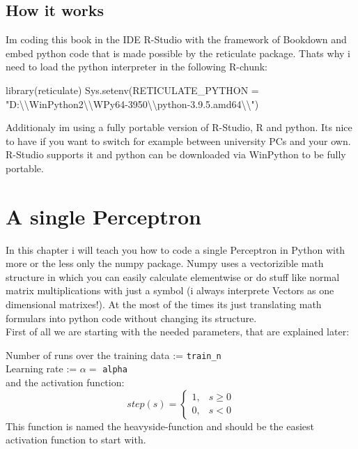 \documentclass[
]{book}
\newenvironment{Shaded}{\begin{snugshade}}{\end{snugshade}}
\newcommand{\AttributeTok}[1]{\textcolor[rgb]{0.77,0.63,0.00}{#1}}
\newcommand{\FunctionTok}[1]{\textcolor[rgb]{0.00,0.00,0.00}{#1}}
\newcommand{\NormalTok}[1]{#1}
\newcommand{\SpecialCharTok}[1]{\textcolor[rgb]{0.00,0.00,0.00}{#1}}
\newcommand{\StringTok}[1]{\textcolor[rgb]{0.31,0.60,0.02}{#1}}
\begin{document}
\hypertarget{how-it-works}{%
\section{How it works}\label{how-it-works}}

Im coding this book in the IDE R-Studio with the framework of Bookdown and embed python code that is made possible by the reticulate package. Thats why i need to load the python interpreter in the following R-chunk:

\begin{Shaded}
\begin{Highlighting}[]
\FunctionTok{library}\NormalTok{(reticulate)}
\FunctionTok{Sys.setenv}\NormalTok{(}\AttributeTok{RETICULATE\_PYTHON =} \StringTok{"D:}\SpecialCharTok{\textbackslash{}\textbackslash{}}\StringTok{WinPython2}\SpecialCharTok{\textbackslash{}\textbackslash{}}\StringTok{WPy64{-}3950}\SpecialCharTok{\textbackslash{}\textbackslash{}}\StringTok{python{-}3.9.5.amd64}\SpecialCharTok{\textbackslash{}\textbackslash{}}\StringTok{"}\NormalTok{)}
\end{Highlighting}
\end{Shaded}

Additionaly im using a fully portable version of R-Studio, R and python. Its nice to have if you want to switch for example between university PCs and your own. R-Studio supports it and python can be downloaded via WinPython to be fully portable.

\hypertarget{a-single-perceptron}{%
\chapter{A single Perceptron}\label{a-single-perceptron}}

In this chapter i will teach you how to code a single Perceptron in Python with more or the less only the numpy package. Numpy uses a vectorizible math structure in which you can easily calculate elementwise or do stuff like normal matrix multiplications with just a symbol (i always interprete Vectors as one dimensional matrixes!). At the most of the times its just translating math formulars into python code without changing its structure.\\
First of all we are starting with the needed parameters, that are explained later:

Number of runs over the training data := \texttt{train\_n}\\
Learning rate := \(\alpha =\) \texttt{alpha}\\
and the activation function:\\
\[ 
step(s)= 
\begin{cases}
    1,& s   \geq 0\\
    0,& s < 0
\end{cases}
\]
This function is named the heavyside-function and should be the easiest activation function to start with.
\end{document}
